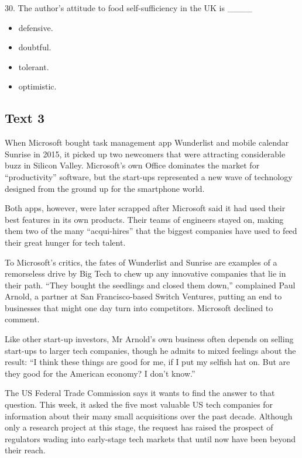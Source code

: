 \documentclass[UTF8,11pt]{ctexart}
\begin{document}
30. The author’s attitude to food self-sufficiency in the UK is \_\_\_\_


\begin{itemize}[leftmargin=2em,itemsep=.2em,topsep=.4em]\item[A.] defensive.
\item[B.] doubtful.
\item[C.] tolerant.
\item[D.] optimistic.
\end{itemize}

\subsection*{\textbf{Text 3}}


When Microsoft bought task management app Wunderlist and mobile calendar Sunrise in 2015, it picked up two newcomers that were attracting considerable buzz in Silicon Valley. Microsoft’s own Office dominates the market for “productivity” software, but the start-ups represented a new wave of technology designed from the ground up for the smartphone world.


Both apps, however, were later scrapped after Microsoft said it had used their best features in its own products. Their teams of engineers stayed on, making them two of the many “acqui-hires” that the biggest companies have used to feed their great hunger for tech talent.


To Microsoft’s critics, the fates of Wunderlist and Sunrise are examples of a remorseless drive by Big Tech to chew up any innovative companies that lie in their path. “They bought the seedlings and closed them down,” complained Paul Arnold, a partner at San Francisco-based Switch Ventures, putting an end to businesses that might one day turn into competitors. Microsoft declined to comment.


Like other start-up investors, Mr Arnold’s own business often depends on selling start-ups to larger tech companies, though he admits to mixed feelings about the result: “I think these things are good for me, if I put my selfish hat on. But are they good for the American economy? I don’t know.”


The US Federal Trade Commission says it wants to find the answer to that question. This week, it asked the five most valuable US tech companies for information about their many small acquisitions over the past decade. Although only a research project at this stage, the request has raised the prospect of regulators wading into early-stage tech markets that until now have been beyond their reach.
\end{document}
